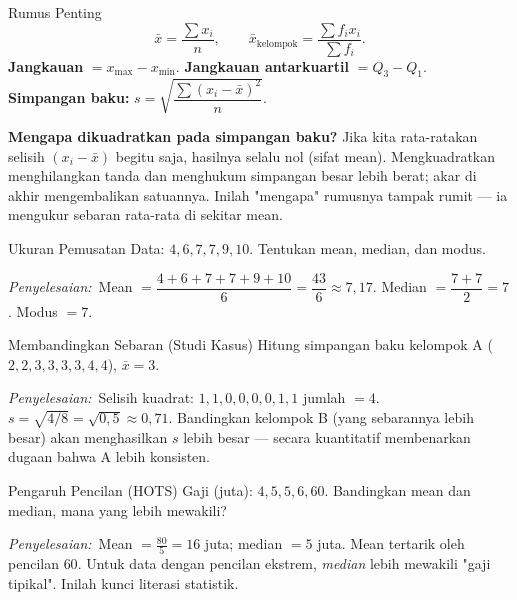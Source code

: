\documentclass[11pt,a4paper]{report}
\theoremstyle{gaya}
\newcommand{\jawab}{\par\smallskip\noindent\textit{\textcolor{oranye}{Penyelesaian:}}\ }
\begin{document}
\begin{konsep}{Rumus Penting}
\[
\bar{x} = \frac{\sum x_i}{n},\qquad
\bar{x}_{\text{kelompok}} = \frac{\sum f_i x_i}{\sum f_i}.
\]
\textbf{Jangkauan} $= x_{\max} - x_{\min}$. \quad
\textbf{Jangkauan antarkuartil} $= Q_3 - Q_1$.\\[4pt]
\textbf{Simpangan baku:}\quad
$s = \sqrt{\dfrac{\sum (x_i - \bar{x})^2}{n}}.$
\end{konsep}

\textbf{Mengapa dikuadratkan pada simpangan baku?} Jika kita rata-ratakan selisih $(x_i-\bar x)$ begitu saja, hasilnya selalu nol (sifat mean). Mengkuadratkan menghilangkan tanda dan menghukum simpangan besar lebih berat; akar di akhir mengembalikan satuannya. Inilah "mengapa" rumusnya tampak rumit --- ia mengukur sebaran rata-rata di sekitar mean.

\begin{contoh}{Ukuran Pemusatan}
Data: $4, 6, 7, 7, 9, 10$. Tentukan mean, median, dan modus.

\jawab Mean $= \dfrac{4+6+7+7+9+10}{6} = \dfrac{43}{6} \approx 7{,}17$.
Median $= \dfrac{7+7}{2} = 7$. Modus $= 7$.
\end{contoh}

\begin{contoh}{Membandingkan Sebaran (Studi Kasus)}
Hitung simpangan baku kelompok A ($2,2,3,3,3,3,4,4$), $\bar x=3$.

\jawab Selisih kuadrat: $1,1,0,0,0,0,1,1$ jumlah $=4$. $s=\sqrt{4/8}=\sqrt{0{,}5}\approx0{,}71$. Bandingkan kelompok B (yang sebarannya lebih besar) akan menghasilkan $s$ lebih besar --- secara kuantitatif membenarkan dugaan bahwa A lebih konsisten.
\end{contoh}

\begin{contoh}{Pengaruh Pencilan (HOTS)}
Gaji (juta): $4,5,5,6,60$. Bandingkan mean dan median, mana yang lebih mewakili?

\jawab Mean $=\tfrac{80}{5}=16$ juta; median $=5$ juta. Mean tertarik oleh pencilan $60$. Untuk data dengan pencilan ekstrem, \emph{median} lebih mewakili "gaji tipikal". Inilah kunci literasi statistik.
\end{contoh}
\end{document}
